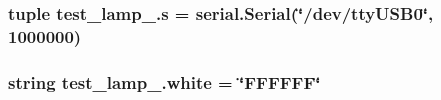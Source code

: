 \subsubsection[{s}]{\setlength{\rightskip}{0pt plus 5cm}tuple test\+\_\+lamp\+\_.\+s = serial.\+Serial(\char`\"{}/dev/tty\+U\+S\+B0\char`\"{}, 1000000)}\label{namespacetest__lamp__2_a589a584a123d57bac1e1f2b7103f583c}
\hypertarget{namespacetest__lamp__2_a331b2516047417e2208f8485dc76c817}{}
\subsubsection[{white}]{\setlength{\rightskip}{0pt plus 5cm}string test\+\_\+lamp\+\_.\+white = \char`\"{}F\+F\+F\+F\+F\+F\char`\"{}}\label{namespacetest__lamp__2_a331b2516047417e2208f8485dc76c817}
